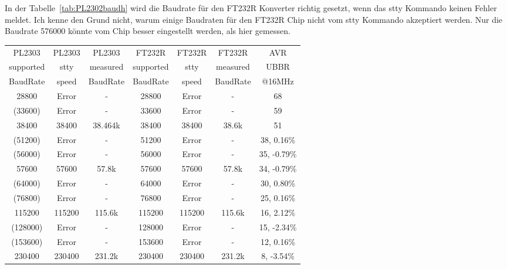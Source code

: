 In der Tabelle~\ref{tab:PL2302baudh} wird die Baudrate für den FT232R Konverter
richtig gesetzt, wenn das stty Kommando keinen Fehler meldet.
Ich kenne den Grund nicht, warum einige Baudraten für den FT232R Chip nicht vom
stty Kommando akzeptiert werden.
Nur die Baudrate 576000 könnte vom Chip besser eingestellt werden, als hier gemessen.

\begin{table}[H]
  \begin{center}
    \begin{tabular}{| c | c | c || c | c | c || c |}
    \hline
    PL2303     & PL2303 & PL2303   &  FT232R   & FT232R & FT232R    & AVR \\
    supported  & stty  & measured  & supported & stty   & measured  & UBBR  \\
    BaudRate   & speed & BaudRate  & BaudRate  & speed  & BaudRate  & @16MHz \\
    \hline
    \hline
    \hline
      28800  &  Error   &   -       &  28800    & Error  &    -      &   68 \\
    \hline
     (33600) &  Error   &   -       &  33600    & Error  &    -      &   59  \\
    \hline
      38400  &  38400   &  38.464k  &  38400    & 38400  &  38.6k   &   51  \\
    \hline
    (51200)  &  Error   &   -       &  51200    & Error  &    -      &   38,  0.16\%  \\
    \hline
    (56000)  &  Error   &   -       &  56000    & Error  &    -      &   35, -0.79\%  \\
    \hline
      57600  &  57600   &  57.8k    &  57600    & 57600  &  57.8k    &   34, -0.79\%  \\
    \hline
    (64000)  &  Error   &   -       &  64000    & Error  &    -      &   30,  0.80\%  \\
    \hline
    (76800)  &  Error   &   -       &  76800    & Error  &    -      &   25, 0.16\%  \\
    \hline
     115200  &  115200  &  115.6k   &  115200   & 115200 &  115.6k   &   16, 2.12\%  \\
    \hline
    (128000) &  Error   &   -       &  128000   & Error  &    -      &   15, -2.34\%  \\
    \hline
    (153600) &  Error   &   -       &  153600   & Error  &    -      &   12, 0.16\%  \\
    \hline
     230400  &  230400  &  231.2k   &  230400   & 230400 &  231.2k   &   8, -3.54\%  \\

\end{tabular}
\end{center}
\end{table}
